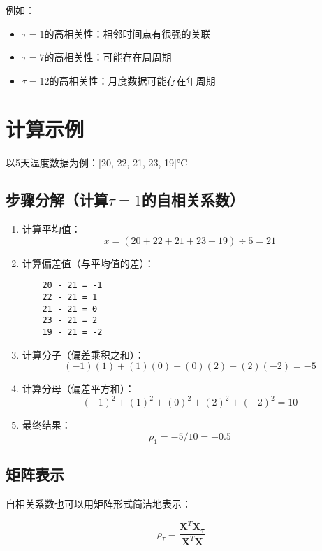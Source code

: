 \documentclass{article}
\begin{document}
例如：
\begin{itemize}
    \item $\tau=1$的高相关性：相邻时间点有很强的关联
    \item $\tau=7$的高相关性：可能存在周周期
    \item $\tau=12$的高相关性：月度数据可能存在年周期
\end{itemize}

\section{计算示例}

以5天温度数据为例：[20, 22, 21, 23, 19]°C

\subsection{步骤分解（计算$\tau=1$的自相关系数）}

\begin{enumerate}
    \item 计算平均值：
    \[ \bar{x} = (20 + 22 + 21 + 23 + 19) \div 5 = 21 \]
    
    \item 计算偏差值（与平均值的差）：
    \begin{verbatim}
    20 - 21 = -1
    22 - 21 = 1
    21 - 21 = 0
    23 - 21 = 2
    19 - 21 = -2
    \end{verbatim}
    
    \item 计算分子（偏差乘积之和）：
    \[ (-1)(1) + (1)(0) + (0)(2) + (2)(-2) = -5 \]
    
    \item 计算分母（偏差平方和）：
    \[ (-1)^2 + (1)^2 + (0)^2 + (2)^2 + (-2)^2 = 10 \]
    
    \item 最终结果：
    \[ \rho_1 = -5/10 = -0.5 \]
\end{enumerate}

\subsection{矩阵表示}

自相关系数也可以用矩阵形式简洁地表示：

\begin{equation}
    \rho_\tau = \frac{\mathbf{X}^T\mathbf{X_\tau}}{\mathbf{X}^T\mathbf{X}}
\end{equation}
\end{document}
